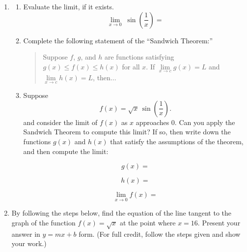 \documentclass[fleqn,12pt]{article}
\newcommand{\<}{\ensuremath{\langle}}
\renewcommand{\>}{\ensuremath{\rangle}}
\begin{document}
\begin{enumerate}
    \item 
      \begin{enumerate}[{\it i.}]

        \bigskip
      \item  Evaluate the limit, if it exists.
        \label{item:5i}
        \[
        \lim_{x \rightarrow 0} \; \sin \left(\frac{1}{x}\right) =
        \]


        \bigskip

        \bigskip


      \item 
        \label{item:5ii} Complete the following statement of the ``Sandwich Theorem:''

        \bigskip

        \begin{quote}
          Suppose $f$, $g$, and $h$ are functions satisfying $g(x) \leq f(x) \leq h(x)$ for
          all $x$.  If $\lim\limits_{x\rightarrow c} g(x) = L$ and $\lim\limits_{x\rightarrow c} h(x) = L$, then...
        \end{quote}

        \vskip4cm


      \item 
        \label{item:5ii} 
        Suppose 
        \[
        f(x) = \sqrt{x} \,\sin \left(\frac{1}{x}\right).
        \]
        and consider the limit of $f(x)$ as $x$ approaches $0$.
        Can you apply the Sandwich Theorem to compute this limit? 
        If so, then write down the
        functions $g(x)$ and $h(x)$ that satisfy the assumptions of the 
        theorem, and then compute the limit: 

        \[ g(x) = \]

        \[ h(x) = \]

        \bigskip

        \[
        \lim_{x \rightarrow 0} f(x) = 
        \]
      \end{enumerate}



      \newpage

    \item By following the steps below, find the equation of the line tangent to the
      graph of the function  
      $f(x) = \sqrt{x}$ at the point where $x = 16$.
      Present your answer in $y = mx + b$ form.  
      (For full credit, follow the steps given and show your work.)


\end{enumerate}
\end{document}
